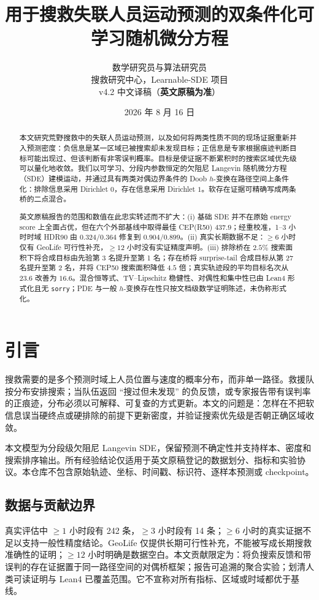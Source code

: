 \documentclass[UTF8,11pt]{ctexart}
\title{用于搜救失联人员运动预测的双条件化可学习随机微分方程}
\author{数学研究员与算法研究员\\搜救研究中心，Learnable-SDE 项目\\
v4.2 中文译稿（\textbf{英文原稿为准}）}
\date{2026 年 8 月 16 日}
\begin{document}
\maketitle

\begin{abstract}
本文研究荒野搜救中的失联人员运动预测，以及如何将两类性质不同的现场证据重新并入预测密度：负信息是某一区域已被搜索却未发现目标；正信息是专家根据痕迹判断目标可能出现过、但该判断有非零误判概率。目标是使证据不断累积时的搜索区域优先级可以量化地收敛。我们以可学习、分段内参数恒定的欠阻尼 Langevin 随机微分方程（SDE）建模运动，并通过具有两类对偶边界条件的 Doob $h$-变换在路径空间上条件化：排除信息采用 Dirichlet $0$，存在信息采用 Dirichlet $1$。软存在证据可精确写成两条桥的二点混合。

英文原稿报告的范围和数值在此忠实转述而不扩大：(i) 基础 SDE 并不在原始 energy score 上全面占优，但在六个外部基线中取得最佳 CEP(R50) $437.9$；经重校准，1--3 小时时域 HDR90 由 $0.324/0.364$ 修复到 $0.904/0.899$。(ii) 真实长期数据不足：$\ge6$ 小时仅有 GeoLife 可行性补充，$\ge12$ 小时没有实证精度声明。(iii) 排除桥在 $2.5\%$ 搜索面积下将合成目标由先验第 3 名提升至第 1 名；存在桥将 surprise-tail 合成目标从第 27 名提升至第 2 名，并将 CEP50 搜索面积降低 $4.5$ 倍；真实轨迹段的平均目标名次从 $23.6$ 改善为 $16.6$。混合恒等式、TV--Lipschitz 稳健性、对偶性和集中性已由 Lean4 形式化且无 \texttt{sorry}；PDE 与一般 $h$-变换存在性只按文档级数学证明陈述，未伪称形式化。
\end{abstract}

\section{引言}
搜救需要的是多个预测时域上人员位置与速度的概率分布，而非单一路径。救援队按分布安排搜索；当队伍返回 ``搜过但未发现'' 的负反馈，或专家报告带有误判率的正痕迹，分布必须以可解释、可复查的方式更新。本文的问题是：怎样在不把软信息误当硬终点或硬排除的前提下更新密度，并验证搜索优先级是否朝正确区域收敛。

本文模型为分段级欠阻尼 Langevin SDE，保留预测不确定性并支持样本、密度和搜索排序输出。所有经验结论仅适用于英文原稿登记的数据划分、指标和实验协议。本仓库不包含原始轨迹、坐标、时间戳、标识符、逐样本预测或 checkpoint。

\subsection{数据与贡献边界}
真实评估中 $\ge1$ 小时段有 242 条，$\ge3$ 小时段有 14 条；$\ge6$ 小时的真实证据不足以支持一般性精度结论。GeoLife 仅提供长期可行性补充，不能被写成长期搜救准确性的证明；$\ge12$ 小时明确是数据空白。本文贡献限定为：将负搜索反馈和带误判的存在证据置于同一路径空间的对偶桥框架；报告可追溯的聚合实验；划清人类可读证明与 Lean4 已覆盖范围。它不宣称对所有指标、区域或时域都优于基线。
\end{document}

